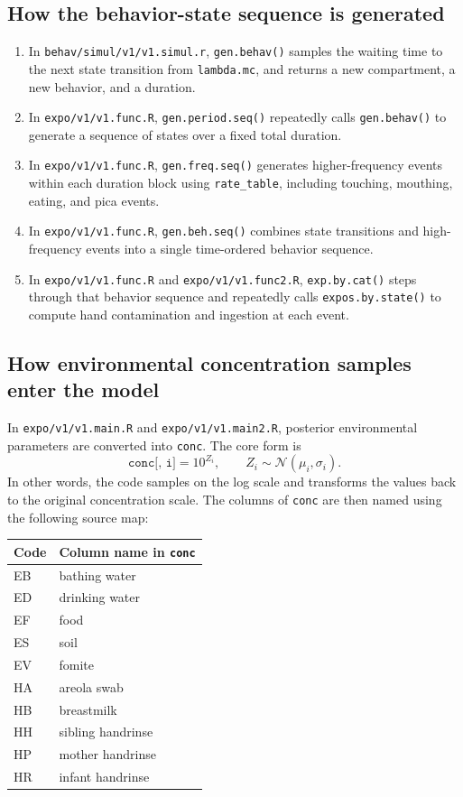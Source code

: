 \documentclass[11pt]{article}
\begin{document}
\subsection{How the behavior-state sequence is generated}
\begin{enumerate}[leftmargin=2em]
  \item In \texttt{behav/simul/v1/v1.simul.r}, \texttt{gen.behav()} samples the waiting time to the next state transition from \texttt{lambda.mc}, and returns a new compartment, a new behavior, and a duration.
  \item In \texttt{expo/v1/v1.func.R}, \texttt{gen.period.seq()} repeatedly calls \texttt{gen.behav()} to generate a sequence of states over a fixed total duration.
  \item In \texttt{expo/v1/v1.func.R}, \texttt{gen.freq.seq()} generates higher-frequency events within each duration block using \texttt{rate\_table}, including touching, mouthing, eating, and pica events.
  \item In \texttt{expo/v1/v1.func.R}, \texttt{gen.beh.seq()} combines state transitions and high-frequency events into a single time-ordered behavior sequence.
  \item In \texttt{expo/v1/v1.func.R} and \texttt{expo/v1/v1.func2.R}, \texttt{exp.by.cat()} steps through that behavior sequence and repeatedly calls \texttt{expos.by.state()} to compute hand contamination and ingestion at each event.
\end{enumerate}

\subsection{How environmental concentration samples enter the model}
In \texttt{expo/v1/v1.main.R} and \texttt{expo/v1/v1.main2.R}, posterior environmental parameters are converted into \texttt{conc}. The core form is
\[
\texttt{conc[, i]} = 10^{Z_i}, \qquad Z_i \sim \mathcal{N}(\mu_i, \sigma_i).
\]
In other words, the code samples on the log scale and transforms the values back to the original concentration scale. The columns of \texttt{conc} are then named using the following source map:
\begin{center}
\begin{tabular}{ll}
\toprule
Code & Column name in \texttt{conc} \\
\midrule
EB & bathing water \\
ED & drinking water \\
EF & food \\
ES & soil \\
EV & fomite \\
HA & areola swab \\
HB & breastmilk \\
HH & sibling handrinse \\
HP & mother handrinse \\
HR & infant handrinse \\
\bottomrule
\end{tabular}
\end{center}
\end{document}

